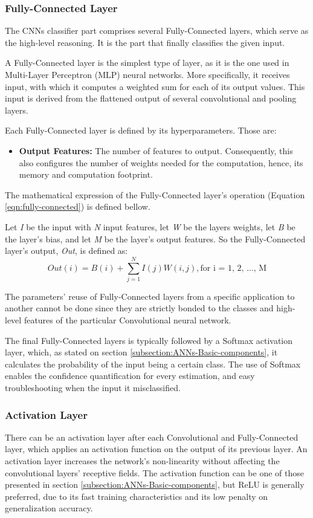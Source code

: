 \subsubsection{Fully-Connected Layer}
The CNNs classifier part comprises several Fully-Connected layers, which serve as the high-level reasoning. It is the part that finally classifies the given input.

A Fully-Connected layer is the simplest type of layer, as it is the one used in Multi-Layer Perceptron (MLP) neural networks. More specifically, it receives input, with which it computes a weighted sum for each of its output values. This input is derived from the flattened output of several convolutional and pooling layers.

Each Fully-Connected layer is defined by its hyperparameters. Those are:
\begin{itemize}
	\item \textbf{Output Features:} The number of features to output. Consequently, this also configures the number of weights needed for the computation, hence, its memory and computation footprint.
\end{itemize}

The mathematical expression of the Fully-Connected layer's operation (Equation \ref{eqn:fully-connected}) is defined bellow.

Let \emph{I} be the input with \emph{N} input features, let \emph{W} be the layers weights, let \emph{B} be the layer's bias, and let \emph{M} be the layer's output features. So the Fully-Connected layer's output, \emph{Out}, is defined as:
\begin{equation}
	\label{eqn:fully-connected}
	Out(i) = B(i) + \sum_{j = 1}^{N} I(j)W(i, j), \mbox{for i = 1, 2, ..., M}
\end{equation}

The parameters' reuse of Fully-Connected layers from a specific application to another cannot be done since they are strictly bonded to the classes and high-level features of the particular Convolutional neural network.

The final Fully-Connected layers is typically followed by a Softmax activation layer, which, as stated on section \ref{subsection:ANNs-Basic-components}, it calculates the probability of the input being a certain class. The use of Softmax enables the confidence quantification for every estimation, and easy troubleshooting when the input it misclassified.

\subsubsection{Activation Layer}
There can be an activation layer after each Convolutional and Fully-Connected layer, which applies an activation function on the output of its previous layer. An activation layer increases the network's non-linearity without affecting the convolutional layers' receptive fields. The activation function can be one of those presented in section \ref{subsection:ANNs-Basic-components}, but ReLU is generally preferred, due to its fast training characteristics and its low penalty on generalization accuracy.

